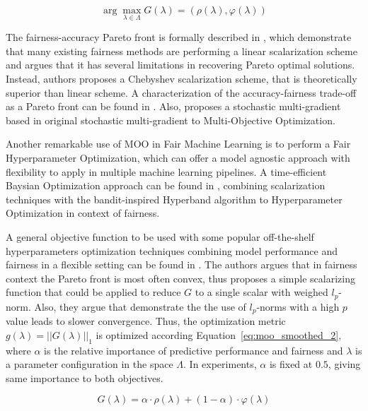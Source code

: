 \begin{equation}\label{def:scalarized_moo}
\arg\max\limits_{\lambda\in\Lambda} G(\lambda) = (\rho(\lambda), \varphi(\lambda))
\end{equation}

The fairness-accuracy Pareto front is formally described in \cite{Wei2022}, which demonstrate that many existing fairness methods are performing a linear scalarization scheme and argues that it has several limitations in recovering Pareto optimal solutions. Instead, authors proposes a Chebyshev scalarization scheme, that is theoretically superior than linear scheme. A characterization of the accuracy-fairness trade-off as a Pareto front can be found in \cite{Liu2022}. Also, \cite{Mercier2018} proposes a stochastic multi-gradient based in original stochastic multi-gradient to Multi-Objective Optimization.

Another remarkable use of MOO in Fair Machine Learning is to perform a Fair Hyperparameter Optimization, which can offer a model agnostic approach with flexibility to apply in multiple machine learning pipelines. A time-efficient Baysian Optimization approach can be found in \cite{Schmucker2020}, combining scalarization techniques with the bandit-inspired Hyperband \citep{Li2016} algorithm to Hyperparameter Optimization in context of fairness.

A general objective function to be used with some popular off-the-shelf hyperparameters optimization techniques combining model performance and fairness in a flexible setting can be found in \cite{Cruz2021}. The authors argues that in fairness context the Pareto front is most often convex, thus proposes a simple scalarizing function that could be applied to reduce $G$ to a single scalar with weighed $l_p$-norm. Also, they argue that \cite{GIAGKIOZIS2015338} demonstrate the the  use  of $l_p$-norms with a high $p$ value leads to slower convergence. Thus, the optimization metric $g(\lambda) = ||G(\lambda)||_1$ is optimized according Equation~\ref{eq:moo_smoothed_2}, where $\alpha$ is the relative importance of predictive performance and fairness and $\lambda$ is a parameter configuration in the space $\Lambda$. In experiments, $\alpha$ is fixed at $0.5$, giving same importance to both objectives.

\begin{equation} \label{eq:moo_smoothed_2}
    G(\lambda) = \alpha \cdot \rho(\lambda) + (1-\alpha) \cdot \varphi(\lambda)
\end{equation}

